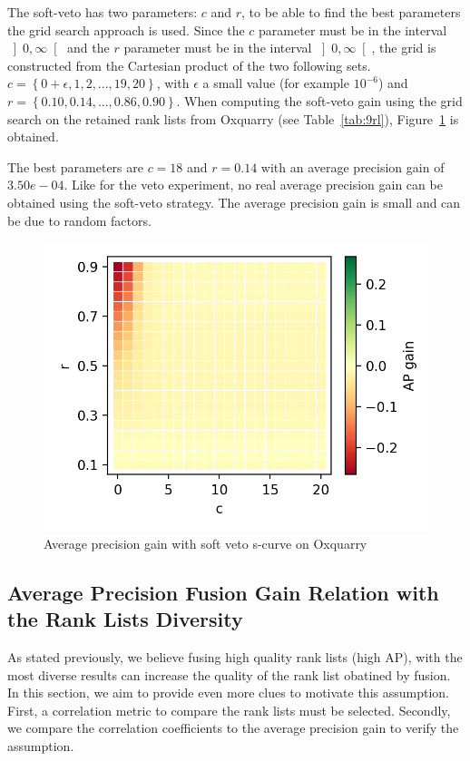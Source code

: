 The soft-veto has two parameters: $c$ and $r$, to be able to find the best parameters the grid search approach is used.
Since the $c$ parameter must be in the interval $\left]0, \infty\right[$ and the $r$ parameter must be in the interval $\left]0, \infty\right[$, the grid is constructed from the Cartesian product of the two following sets.
$c = \left\{0 + \epsilon, 1, 2, ..., 19, 20\right\}$, with $\epsilon$ a small value (for example $10^{-6}$) and $r = \left\{0.10, 0.14, ..., 0.86, 0.90\right\}$.
When computing the soft-veto gain using the grid search on the retained rank lists from Oxquarry (see Table~\ref{tab:9rl}), Figure~\ref{fig:soft_veto} is obtained.

The best parameters are $c=18$ and $r=0.14$ with an average precision gain of $3.50e-04$.
Like for the veto experiment, no real average precision gain can be obtained using the soft-veto strategy.
The average precision gain is small and can be due to random factors.

\begin{figure}
  \caption{Average precision gain with soft veto s-curve on Oxquarry}
  \label{fig:soft_veto}
  \includegraphics[width=\linewidth]{img/soft_veto.png}
\end{figure}

\subsection{Average Precision Fusion Gain Relation with the Rank Lists Diversity \label{sec:fusion_diversity}}

As stated previously, we believe fusing high quality rank lists (high AP), with the most diverse results can increase the quality of the rank list obatined by fusion.
In this section, we aim to provide even more clues to motivate this assumption.
First, a correlation metric to compare the rank lists must be selected.
Secondly, we compare the correlation coefficients to the average precision gain to verify the assumption.

